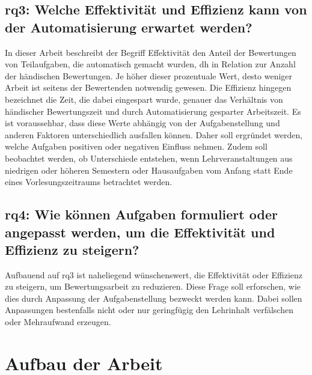 \subsection[\acs{rq}3]{\ac{rq}3: Welche Effektivität und Effizienz kann von der Automatisierung erwartet werden?}\label{subsec:rq3-effectivity-efficiency}

In dieser Arbeit beschreibt der Begriff Effektivität den Anteil der Bewertungen von Teilaufgaben, die automatisch gemacht wurden, \ac{dh} in Relation zur Anzahl der händischen Bewertungen.
Je höher dieser prozentuale Wert, desto weniger Arbeit ist seitens der Bewertenden notwendig gewesen.
Die Effizienz hingegen bezeichnet die Zeit, die dabei eingespart wurde, genauer das Verhältnis von händischer Bewertungszeit und durch Automatisierung gesparter Arbeitszeit.
Es ist voraussehbar, dass diese Werte abhängig von der Aufgabenstellung und anderen Faktoren unterschiedlich ausfallen können.
Daher soll ergründet werden, welche Aufgaben positiven oder negativen Einfluss nehmen.
Zudem soll beobachtet werden, ob Unterschiede entstehen, wenn Lehrveranstaltungen aus niedrigen oder höheren Semestern oder Hausaufgaben vom Anfang statt Ende eines Vorlesungszeitraums betrachtet werden.

\subsection[\acs{rq}4]{\ac{rq}4: Wie können Aufgaben formuliert oder angepasst werden, um die Effektivität und Effizienz zu steigern?}\label{subsec:rq4-improve-effectivity-efficiency}

Aufbauend auf \acs{rq}3 ist naheliegend wünschenswert, die Effektivität oder Effizienz zu steigern, um Bewertungsarbeit zu reduzieren.
Diese Frage soll erforschen, wie dies durch Anpassung der Aufgabenstellung bezweckt werden kann.
Dabei sollen Anpassungen bestenfalls nicht oder nur geringfügig den Lehrinhalt verfälschen oder Mehraufwand erzeugen.

\section{Aufbau der Arbeit}\label{sec:structure}

